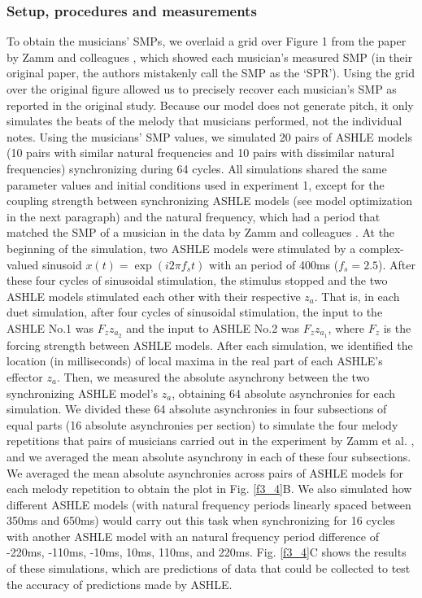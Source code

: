 \documentclass{report}
\begin{document}
\subsubsection{Setup, procedures and measurements}

To obtain the musicians' SMPs, we overlaid a grid over Figure 1 from the paper by Zamm and colleagues \cite{zamm2016endogenous}, which showed each musician's measured SMP (in their original paper, the authors mistakenly call the SMP as the `SPR'). Using the grid over the original figure allowed us to precisely recover each musician's SMP as reported in the original study. Because our model does not generate pitch, it only simulates the beats of the melody that musicians performed, not the individual notes. Using the musicians' SMP values, we simulated 20 pairs of ASHLE models (10 pairs with similar natural frequencies and 10 pairs with dissimilar natural frequencies) synchronizing during 64 cycles. All simulations shared the same parameter values and initial conditions used in experiment 1, except for the coupling strength between synchronizing ASHLE models (see model optimization in the next paragraph) and the natural frequency, which had a period that matched the SMP of a musician in the data by Zamm and colleagues \cite{zamm2016endogenous}. At the beginning of the simulation, two ASHLE models were stimulated by a complex-valued sinusoid $x(t)=\exp(i2\pi	f_s t)$ with an period of 400ms ($f_s = 2.5$). After these four cycles of sinusoidal stimulation, the stimulus stopped and the two ASHLE models stimulated each other with their respective $z_a$. That is, in each duet simulation, after four cycles of sinusoidal stimulation, the input to the ASHLE No.1 was $F_z z_{a_2}$ and the input to ASHLE No.2 was $F_z z_{a_1}$, where $F_z$ is the forcing strength between ASHLE models. After each simulation, we identified the location (in milliseconds) of local maxima in the real part of each ASHLE's effector $z_a$. Then, we measured the absolute asynchrony between the two synchronizing ASHLE model's $z_a$, obtaining 64 absolute asynchronies for each simulation. We divided these 64 absolute asynchronies in four subsections of equal parts (16 absolute asynchronies per section) to simulate the four melody repetitions that pairs of musicians carried out in the experiment by Zamm et al. \cite{zamm2016endogenous}, and we averaged the mean absolute asynchrony in each of these four subsections. We averaged the mean absolute asynchronies across pairs of ASHLE models for each melody repetition to obtain the plot in Fig.{} \ref{f3_4}B. We also simulated how different ASHLE models (with natural frequency periods linearly spaced between 350ms and 650ms) would carry out this task when synchronizing for 16 cycles with another ASHLE model with an natural frequency period difference of -220ms, -110ms, -10ms, 10ms, 110ms, and 220ms. Fig.{} \ref{f3_4}C shows the results of these simulations, which are predictions of data that could be collected to test the accuracy of predictions made by ASHLE.
\end{document}
